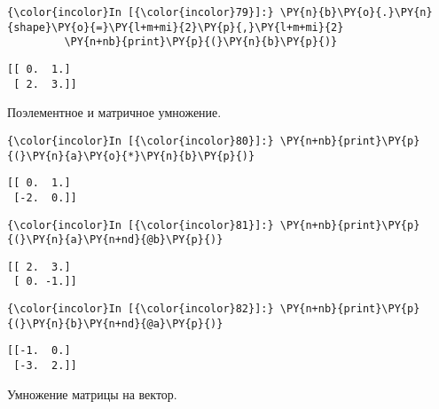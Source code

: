     \begin{Verbatim}[commandchars=\\\{\}]
{\color{incolor}In [{\color{incolor}79}]:} \PY{n}{b}\PY{o}{.}\PY{n}{shape}\PY{o}{=}\PY{l+m+mi}{2}\PY{p}{,}\PY{l+m+mi}{2}
         \PY{n+nb}{print}\PY{p}{(}\PY{n}{b}\PY{p}{)}
\end{Verbatim}

    \begin{Verbatim}[commandchars=\\\{\}]
[[ 0.  1.]
 [ 2.  3.]]

    \end{Verbatim}

    Поэлементное и матричное умножение.

    \begin{Verbatim}[commandchars=\\\{\}]
{\color{incolor}In [{\color{incolor}80}]:} \PY{n+nb}{print}\PY{p}{(}\PY{n}{a}\PY{o}{*}\PY{n}{b}\PY{p}{)}
\end{Verbatim}

    \begin{Verbatim}[commandchars=\\\{\}]
[[ 0.  1.]
 [-2.  0.]]

    \end{Verbatim}

    \begin{Verbatim}[commandchars=\\\{\}]
{\color{incolor}In [{\color{incolor}81}]:} \PY{n+nb}{print}\PY{p}{(}\PY{n}{a}\PY{n+nd}{@b}\PY{p}{)}
\end{Verbatim}

    \begin{Verbatim}[commandchars=\\\{\}]
[[ 2.  3.]
 [ 0. -1.]]

    \end{Verbatim}

    \begin{Verbatim}[commandchars=\\\{\}]
{\color{incolor}In [{\color{incolor}82}]:} \PY{n+nb}{print}\PY{p}{(}\PY{n}{b}\PY{n+nd}{@a}\PY{p}{)}
\end{Verbatim}

    \begin{Verbatim}[commandchars=\\\{\}]
[[-1.  0.]
 [-3.  2.]]

    \end{Verbatim}

    Умножение матрицы на вектор.

